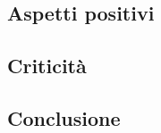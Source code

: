 \documentclass{article}
\begin{document}
    \subsection{Aspetti positivi}
    
    \subsection{Criticità}
    
    \subsection{Conclusione}
\end{document}
